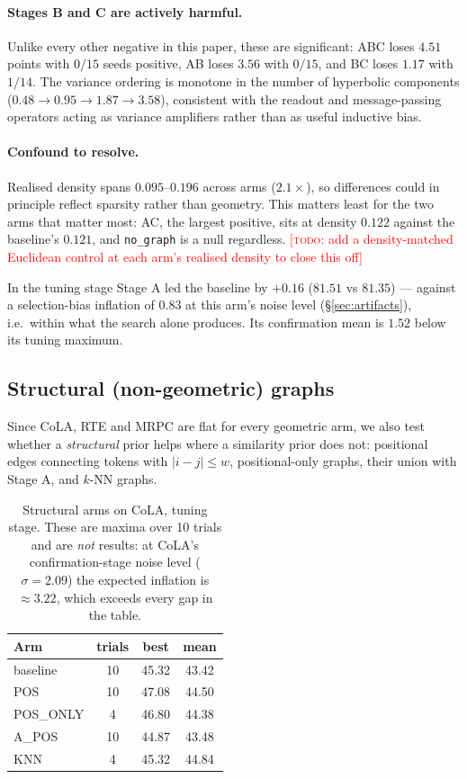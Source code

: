 \documentclass{article} %
\newcommand{\TODO}[1]{\textcolor{red}{[\textsc{todo}: #1]}}
\begin{document}
\paragraph{Stages B and C are actively harmful.} Unlike every other negative in
this paper, these are significant: ABC loses $4.51$ points with $0/15$ seeds
positive, AB loses $3.56$ with $0/15$, and BC loses $1.17$ with $1/14$. The
variance ordering is monotone in the number of hyperbolic components
($0.48 \rightarrow 0.95 \rightarrow 1.87 \rightarrow 3.58$), consistent with the
readout and message-passing operators acting as variance amplifiers rather than
as useful inductive bias.

\paragraph{Confound to resolve.} Realised density spans $0.095$--$0.196$ across
arms ($2.1\times$), so differences could in principle reflect sparsity rather
than geometry. This matters least for the two arms that matter most: AC, the
largest positive, sits at density $0.122$ against the baseline's $0.121$, and
\texttt{no\_graph} is a null regardless. \TODO{add a density-matched Euclidean
control at each arm's realised density to close this off}

In the tuning stage Stage A led the baseline by $+0.16$
($81.51$ vs $81.35$) --- against a selection-bias inflation of $0.83$ at this
arm's noise level (\S\ref{sec:artifacts}), i.e.\ within what the search alone
produces. Its confirmation mean is $1.52$ below its tuning maximum.

\subsection{Structural (non-geometric) graphs}
Since CoLA, RTE and MRPC are flat for every geometric arm, we also test whether
a \emph{structural} prior helps where a similarity prior does not: positional
edges connecting tokens with $|i - j| \leq w$, positional-only graphs, their
union with Stage A, and $k$-NN graphs.

\begin{table}[t]
\caption{Structural arms on CoLA, tuning stage. These are maxima over 10
trials and are \emph{not} results: at CoLA's confirmation-stage noise level
($\sigma = 2.09$) the expected inflation is $\approx 3.22$, which exceeds every
gap in the table.}
\label{tab:structural}
\begin{center}
\begin{tabular}{lccc}
\toprule
Arm & trials & best & mean \\
\midrule
baseline           & 10 & 45.32 & 43.42 \\
POS                & 10 & 47.08 & 44.50 \\
POS\_ONLY          & \phantom{0}4 & 46.80 & 44.38 \\
A\_POS             & 10 & 44.87 & 43.48 \\
KNN                & \phantom{0}4 & 45.32 & 44.84 \\
\bottomrule
\end{tabular}
\end{center}
\end{table}
\end{document}
